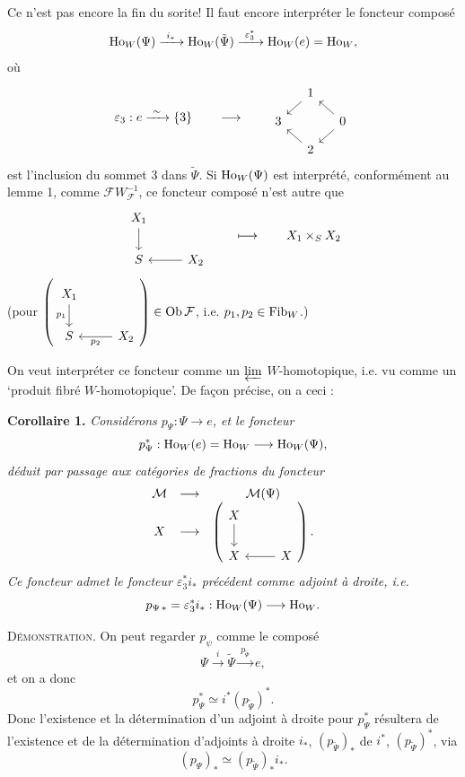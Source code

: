 Ce n'est pas encore la fin du sorite! Il faut encore interpréter le foncteur composé
\[
\Ho_W(\Psi)\xrightarrow{\ i_*\ }\Ho_W(\tilde{\Psi})\xrightarrow{\ \varepsilon_3^*\ }\Ho_W(e)=\Ho_W,
\]
où
\[
\varepsilon_3 : e\xrightarrow{\ \sim\ }\{3\}
\qquad\longrightarrow\qquad
\begin{tikzcd}[ampersand replacement=\&, column sep=small, row sep=small]
\& 1 \arrow[dl] \& \\
3 \& \& 0 \arrow[ul] \arrow[dl] \\
\& 2 \arrow[ul] \&
\end{tikzcd}
\]
est l'inclusion du sommet 3 dans $\tilde{\Psi}$. Si $\mathrm{Ho}_W(\Psi)$ est interprété, conformément au lemme 1, comme $\mathcal{F}W_{\mathcal{F}}^{-1}$, ce foncteur composé n'est autre que
\[
\begin{tikzcd}[ampersand replacement=\&]
X_1 \arrow[d] \& \\
S \& X_2 \arrow[l]
\end{tikzcd}
\qquad\longmapsto\qquad X_1\times_S X_2
\]
(pour $\left(\begin{tikzcd}[ampersand replacement=\&] X_1 \arrow[d, "p_1"'] \& \\ S \& X_2 \arrow[l, "p_2"] \end{tikzcd}\right)\in \mathrm{Ob}\,\mathcal{F}$, i.e. $p_1,p_2\in\mathrm{Fib}_W$.)

On veut interpréter ce foncteur comme un $\varprojlim$ $W$-homotopique, i.e. vu comme un `produit fibré $W$-homotopique'. De façon précise, on a ceci :

\textbf{Corollaire 1.} \textit{Considérons $p_\Psi : \Psi\longrightarrow e$, et le foncteur}
\[
p_\Psi^* : \mathrm{Ho}_W(e)=\mathrm{Ho}_W\longrightarrow\mathrm{Ho}_W(\Psi),
\]
\textit{déduit par passage aux catégories de fractions du foncteur}
\[
\begin{array}{ccc}
\mathcal{M} & \longrightarrow & \mathcal{M}(\Psi) \\
X & \longrightarrow & \left(
\begin{tikzcd}[ampersand replacement=\&]
X \arrow[d] \& \\
X \& X \arrow[l]
\end{tikzcd}
\right).
\end{array}
\]
\textit{Ce foncteur admet le foncteur $\varepsilon_3^*i_*$ précédent comme adjoint à droite, i.e.}
\[
p_{\Psi\,*}=\varepsilon_3^*i_* : \mathrm{Ho}_W(\Psi)\longrightarrow\mathrm{Ho}_W.
\]

\textsc{Démonstration}. On peut regarder $p_\psi$ comme le composé %
\[
\Psi\xrightarrow{\ i\ }\tilde{\Psi}\xrightarrow{\ p_{\tilde{\Psi}}\ }e,
\]
et on a donc
\[
p_\Psi^*\simeq i^*(p_{\tilde{\Psi}})^*.
\]
Donc l'existence et la détermination d'un adjoint à droite pour $p_\Psi^*$ résultera de l'existence et de la détermination d'adjoints à droite $i_*$, $(p_{\tilde{\Psi}})_*$ de $i^*$, $(p_{\tilde{\Psi}})^*$, via
\[
(p_\Psi)_*\simeq(p_{\tilde{\Psi}})_*i_*.
\]

